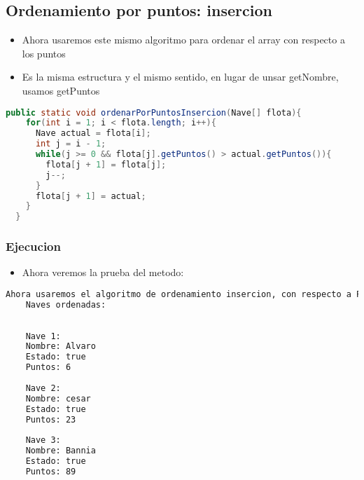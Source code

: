 \subsection{Ordenamiento por puntos: insercion}
\begin{itemize}
    \item Ahora usaremos este mismo algoritmo para ordenar el array con respecto a los puntos
    \item Es la misma estructura y el mismo sentido, en lugar de unsar getNombre, usamos getPuntos
\end{itemize}
\begin{lstlisting}[language=java, caption={Metodo para ordenar por puntos}]
      public static void ordenarPorPuntosInsercion(Nave[] flota){
    for(int i = 1; i < flota.length; i++){
      Nave actual = flota[i];
      int j = i - 1;
      while(j >= 0 && flota[j].getPuntos() > actual.getPuntos()){
        flota[j + 1] = flota[j];
        j--;
      }
      flota[j + 1] = actual;
    }
  }
\end{lstlisting}
\subsubsection{Ejecucion}
\begin{itemize}
    \item Ahora veremos la prueba del metodo:
\end{itemize}
    \begin{lstlisting}[language=bash, caption={Prueba del metodo}]
    Ahora usaremos el algoritmo de ordenamiento insercion, con respecto a Puntos.
    Naves ordenadas:
    
    
    Nave 1:
    Nombre: Alvaro
    Estado: true
    Puntos: 6
    
    Nave 2:
    Nombre: cesar
    Estado: true
    Puntos: 23
    
    Nave 3:
    Nombre: Bannia
    Estado: true
    Puntos: 89      
\end{lstlisting}



